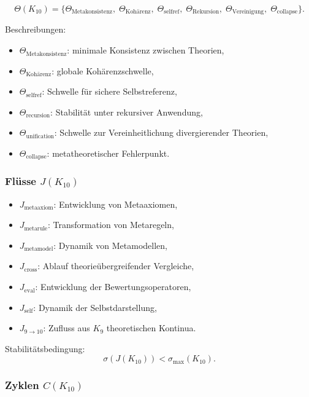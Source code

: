 \[
\Theta(K_{10})=
\{
\Theta_{\mathrm{Metakonsistenz}},\;
\Theta_{\mathrm{Kohärenz}},\;
\Theta_{\mathrm{selfref}},\;
\Theta_{\mathrm{Rekursion}},\;
\Theta_{\mathrm{Vereinigung}},\;
\Theta_{\mathrm{collapse}}
\}.
\]

Beschreibungen:
\begin{itemize}
    \item $\Theta_{\mathrm{Metakonsistenz}}$: minimale Konsistenz zwischen Theorien,
    \item $\Theta_{\mathrm{Kohärenz}}$: globale Kohärenzschwelle,
    \item $\Theta_{\mathrm{selfref}}$: Schwelle für sichere Selbstreferenz,
    \item $\Theta_{\mathrm{recursion}}$: Stabilität unter rekursiver Anwendung,
    \item $\Theta_{\mathrm{unification}}$: Schwelle zur Vereinheitlichung divergierender Theorien,
    \item $\Theta_{\mathrm{collapse}}$: metatheoretischer Fehlerpunkt.
\end{itemize}

\subsubsection{Flüsse $J(K_{10})$}

\begin{itemize}
    \item $J_{\mathrm{metaaxiom}}$: Entwicklung von Metaaxiomen,
    \item $J_{\mathrm{metarule}}$: Transformation von Metaregeln,
    \item $J_{\mathrm{metamodel}}$: Dynamik von Metamodellen,
    \item $J_{\mathrm{cross}}$: Ablauf theorieübergreifender Vergleiche,
    \item $J_{\mathrm{eval}}$: Entwicklung der Bewertungsoperatoren,
    \item $J_{\mathrm{self}}$: Dynamik der Selbstdarstellung,
    \item $J_{9\to10}$: Zufluss aus $K_9$ theoretischen Kontinua.
\end{itemize}

Stabilitätsbedingung:
\[
\sigma(J(K_{10})) < \sigma_{\max}(K_{10}).
\]

\subsubsection{Zyklen $C(K_{10})$}

